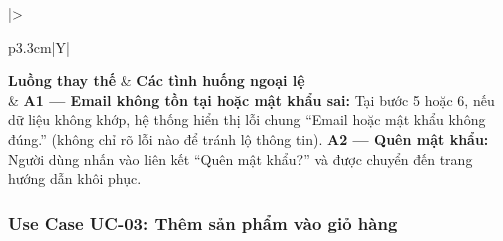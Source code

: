 \documentclass[11pt, a4paper]{article}
\begin{document}
\begin{table}[H]
\begin{tabularx}{\linewidth}{|>{\raggedright\arraybackslash}p{3.3cm}|Y|}
        \textbf{Luồng thay thế} & \textbf{Các tình huống ngoại lệ} \\ \hline
        & \textbf{A1 --- Email không tồn tại hoặc mật khẩu sai:} Tại bước 5 hoặc 6, nếu dữ liệu không khớp, hệ thống hiển thị lỗi chung ``Email hoặc mật khẩu không đúng.'' (không chỉ rõ lỗi nào để tránh lộ thông tin). \newline
          \textbf{A2 --- Quên mật khẩu:} Người dùng nhấn vào liên kết ``Quên mật khẩu?'' và được chuyển đến trang hướng dẫn khôi phục. \\ \hline
    \end{tabularx}
\end{table}

\subsubsection{Use Case UC-03: Thêm sản phẩm vào giỏ hàng}
\end{document}
